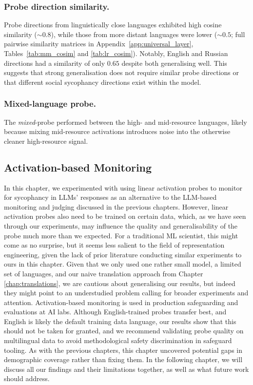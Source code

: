 \subsubsection{Probe direction similarity.}
Probe directions from linguistically close languages exhibited high cosine similarity (${\sim}0.8$), while those from more distant languages were lower (${\sim}0.5$; full pairwise similarity matrices in Appendix~\ref{app:universal_layer}, Tables~\ref{tab:mm_cosim} and \ref{tab:lr_cosim}). Notably, English and Russian directions had a similarity of only $0.65$ despite both generalising well. This suggests that strong generalisation does not require similar probe directions or that different social sycophancy directions exist within the model.

\subsubsection{Mixed-language probe.}
The \textit{mixed}-probe performed between the high- and mid-resource languages, likely because mixing mid-resource activations introduces noise into the otherwise cleaner high-resource signal.


\subsection{Activation-based Monitoring}
In this chapter, we experimented with using linear activation probes to monitor for sycophancy in LLMs' responses as an alternative to the LLM-based monitoring and judging discussed in the previous chapters. However, linear activation probes also need to be trained on certain data, which, as we have seen through our experiments, may influence the quality and generalisability of the probe much more than we expected. For a traditional ML scientist, this might come as no surprise, but it seems less salient to the field of representation engineering, given the lack of prior literature conducting similar experiments to ours in this chapter.
Given that we only used one rather small model, a limited set of languages, and our naive translation approach from Chapter \ref{chap:translations}, we are cautious about generalising our results, but indeed they might point to an understudied problem calling for broader experiments and attention. Activation-based monitoring is used in production safeguarding and evaluations at AI labs. Although English-trained probes transfer best, and English is likely the default training data language, our results show that this should not be taken for granted, and we recommend validating probe quality on multilingual data to avoid methodological safety discrimination in safeguard tooling. As with the previous chapters, this chapter uncovered potential gaps in demographic coverage rather than fixing them. In the following chapter, we will discuss all our findings and their limitations together, as well as what future work should address.




